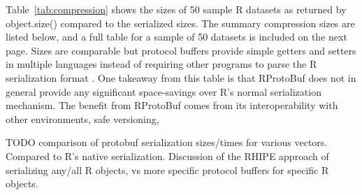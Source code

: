 \documentclass[article]{jss}
\begin{document}
Table~\ref{tab:compression} shows the sizes of 50 sample R datasets as
returned by object.size() compared to the serialized sizes.
The summary compression sizes are listed below, and a full table for a
sample of 50 datasets is included on the next page.  Sizes are comparable
but protocol buffers provide simple getters and setters in multiple
languages instead of requiring other programs to parse the R
serialization format \citep{serialization}.  One takeaway from this
table is that RProtoBuf does not in general provide any significant
space-savings over R's normal serialization mechanism.  The benefit
from RProtoBuf comes from its interoperability with other
environments, safe versioning,

TODO comparison of protobuf serialization sizes/times for various vectors.  Compared to R's native serialization.  Discussion of the RHIPE approach of serializing any/all R objects, vs more specific protocol buffers for specific R objects.
\end{document}
